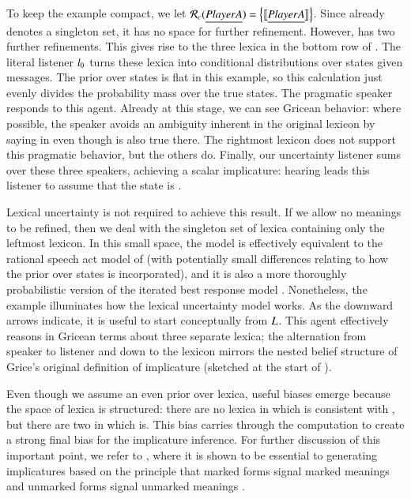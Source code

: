 \documentclass[leqno,12pt]{article}
\begin{document}
To keep the example compact, we let $\mathcal{R}_{c}(\emph{Player A}) =
\left\{ \llbracket\emph{Player A}\rrbracket \right\}$. Since  already denotes a
singleton set, it has no space for further refinement. However,
 has two further refinements. This gives rise to the
three lexica in the bottom row of . The
literal listener $l_{0}$ turns these lexica into conditional
distributions over states given messages.  The prior over states is
flat in this example, so this calculation just evenly divides the
probability mass over the true states. The pragmatic speaker responds
to this agent. Already at this stage, we can see Gricean behavior:
where possible, the speaker avoids an ambiguity inherent in the
original lexicon by saying  in  even
though  is also true there. The rightmost
lexicon does not support this pragmatic behavior, but the others
do. Finally, our uncertainty listener sums over these three speakers,
achieving a scalar implicature: hearing  leads
this listener to assume that the state is .

Lexical uncertainty is not required to achieve this result. If we
allow no meanings to be refined, then we deal with the singleton set
of lexica containing only the leftmost lexicon. In this small space,
the model is effectively equivalent to the rational speech act model of
\citet{Frank:Goodman:2012} (with potentially small differences
relating to how the prior over states is incorporated), and it is also
a more thoroughly probabilistic version of the iterated best response
model \citep{Franke09DISS,Jaeger:2007,Jaeger:2011}. Nonetheless, the
example illuminates how the lexical uncertainty model works. As the
downward arrows indicate, it is useful to start conceptually from
$L$. This agent effectively reasons in Gricean
terms about three separate lexica; the alternation from speaker to
listener and down to the lexicon mirrors the nested belief structure
of Grice's original definition of implicature (sketched at the start
of ).

Even though we assume an even prior over lexica, useful biases emerge
because the space of lexica is structured: there are no lexica in
which  is consistent with , but there are two in
which  is. This bias carries through the computation to
create a strong final bias for the implicature inference. For further
discussion of this important point, we refer to
\citet{Bergen:Levy:Goodman:2014}, where it is shown to be essential to
generating implicatures based on the principle that marked forms
signal marked meanings and unmarked forms signal unmarked meanings
\citep{McCawley78,Horn84,Blutner98,Levinson00}.
\end{document}
